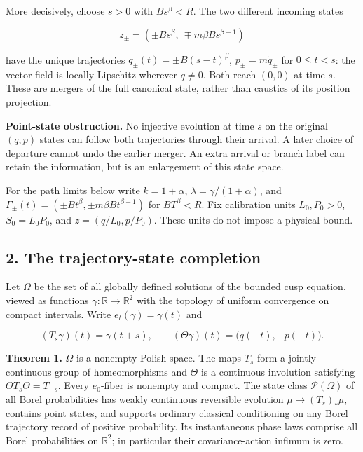\documentclass[11pt,a4paper]{article}
\begin{document}
More decisively, choose \(s>0\) with \(Bs^\beta<R\). The two different
incoming states

\[
 z_\pm=(\pm Bs^\beta,\ \mp m\beta Bs^{\beta-1})
 \tag{5}
\]

have the unique trajectories \(q_\pm(t)=\pm B(s-t)^\beta\),
\(p_\pm=m\dot q_\pm\) for \(0\le t<s\): the vector field is locally
Lipschitz wherever \(q\ne0\). Both reach \((0,0)\) at time \(s\). These
are mergers of the full canonical state, rather than caustics of its
position projection.

\textbf{Point-state obstruction.} No injective evolution at time \(s\)
on the original \((q,p)\) states can follow both trajectories through
their arrival. A later choice of departure cannot undo the earlier
merger. An extra arrival or branch label can retain the information, but
is an enlargement of this state space.

For the path limits below write \(k=1+\alpha\),
\(\lambda=\gamma/(1+\alpha)\), and
\(\Gamma_\pm(t)=(\pm Bt^\beta,\pm m\beta Bt^{\beta-1})\) for
\(BT^\beta<R\). Fix calibration units \(L_0,P_0>0\), \(S_0=L_0P_0\), and
\(z=(q/L_0,p/P_0)\). These units do not impose a physical bound.

\hypertarget{the-trajectory-state-completion}{%
\subsection{2. The trajectory-state
completion}\label{the-trajectory-state-completion}}

Let \(\Omega\) be the set of all globally defined solutions of the
bounded cusp equation, viewed as functions
\(\gamma:\mathbb R\to\mathbb R^2\) with the topology of uniform
convergence on compact intervals. Write \(e_t(\gamma)=\gamma(t)\) and

\[
 (T_s\gamma)(t)=\gamma(t+s),\qquad
 (\Theta\gamma)(t)=\bigl(q(-t),-p(-t)\bigr). \tag{H4}
\]

\textbf{Theorem 1.} \(\Omega\) is a nonempty Polish space. The maps
\(T_s\) form a jointly continuous group of homeomorphisms and \(\Theta\)
is a continuous involution satisfying \(\Theta T_s\Theta=T_{-s}\). Every
\(e_0\)-fiber is nonempty and compact. The state class
\(\mathcal P(\Omega)\) of all Borel probabilities has weakly continuous
reversible evolution \(\mu\mapsto(T_s)_*\mu\), contains point states,
and supports ordinary classical conditioning on any Borel trajectory
record of positive probability. Its instantaneous phase laws comprise
all Borel probabilities on \(\mathbb R^2\); in particular their
covariance-action infimum is zero.
\end{document}
